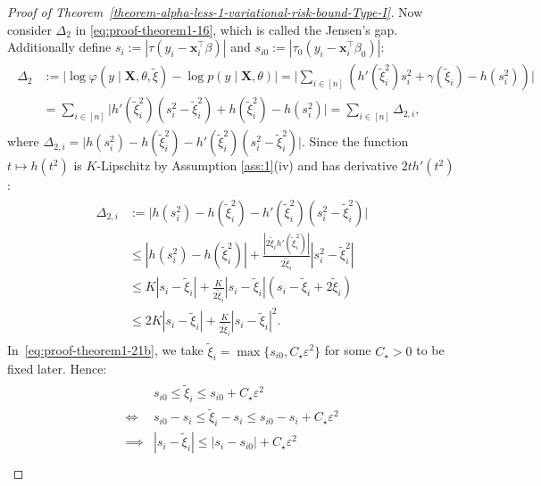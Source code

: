 \documentclass[12pt]{article}
\numberwithin{equation}{section}
\begin{document}
\begin{proof}[Proof of Theorem~\ref{theorem-alpha-less-1-variational-risk-bound-Type-I}]
Now consider $\Delta_2$ in \eqref{eq:proof-theorem1-16}, which is called the Jensen's gap. Additionally define $s_i := |\tau(y_i - \mathbf{x}_i^{\top}\beta)|$ and $s_{i0} := |\tau_0(y_i - \mathbf{x}_i^{\top}\beta_0)|$:
%
\begin{align}\label{eq:proof-theorem1-21a}
    \begin{split}
        \Delta_2 &:= \Big|\log \varphi (y\mid \mathbf{X}, \theta, \tilde{\xi}) - \log p(y\mid \mathbf{X}, \theta)\Big|=\Big|\sum_{i\in [n]}\left(h'(\tilde{\xi}_i^2)s_i^2 + \gamma(\tilde{\xi}_i) - h\left(s_i^2\right)\right)\Big|\\
        &= \sum_{i\in [n]}\Big|h'(\tilde{\xi}_i^2)\left(s_i^2-\tilde{\xi}_i^2\right) + h(\tilde{\xi}_i^2) - h\left(s_i^2\right)\Big| = \sum_{i \in [n]} \Delta_{2,i},
    \end{split}
\end{align}
%
where $\Delta_{2,i} = \Big|h\left(s_i^2\right) - h(\tilde{\xi}_i^2) - h'(\tilde{\xi}_i^2)\left(s_i^2-\tilde{\xi}_i^2\right)\Big|$. Since the function $t \mapsto h(t^2)$ is $K$-Lipschitz by Assumption \ref{ass:1}(iv) and has derivative $2th'(t^2)$:
%
\begin{align}\label{eq:proof-theorem1-21b}
    \begin{split}
        \Delta_{2,i} &:= \Big|h(s_i^2) - h(\tilde{\xi}_i^2) - h'(\tilde{\xi}_i^2)\left(s_i^2-\tilde{\xi}_i^2\right)\Big|\\
        &\leq |h(s_i^2) - h(\tilde{\xi}_i^2)| + \frac{|2\tilde{\xi}_i h'(\tilde{\xi}_i^2)|}{2\tilde{\xi}_i}|s_i^2-\tilde{\xi}_i^2|\\
        &\leq K |s_i - \tilde{\xi}_i| + \frac{K}{2\tilde{\xi}_i}| s_i - \tilde{\xi}_i|(s_i -  \tilde{\xi}_i + 2\tilde{\xi}_i)\\
        &\leq 2K|s_i - \tilde{\xi}_i| + \frac{K}{2\tilde{\xi}_i}|s_i - \tilde{\xi}_i|^2.
    \end{split}
\end{align}
%
In~\eqref{eq:proof-theorem1-21b}, we take $\tilde{\xi}_i = \max\{s_{i0}, C_{\star}\varepsilon^2\}$ for some $C_{\star}>0$ to be fixed later. Hence:
%
\begin{align}\label{eq:proof-theorem1-21c}
    \begin{split}
        &s_{i0} \leq \tilde{\xi}_i \leq s_{i0} + C_{\star}\varepsilon^2 \\ \iff
        &s_{i0} - s_i \leq \tilde{\xi}_i - s_i \leq s_{i0} - s_i + C_{\star}\varepsilon^2 \\ 
        \implies &|s_i - \tilde{\xi}_i| \leq |s_i - s_{i0}| + C_{\star}\varepsilon^2 \\

\end{split}
\end{align}
\end{proof}
\end{document}
